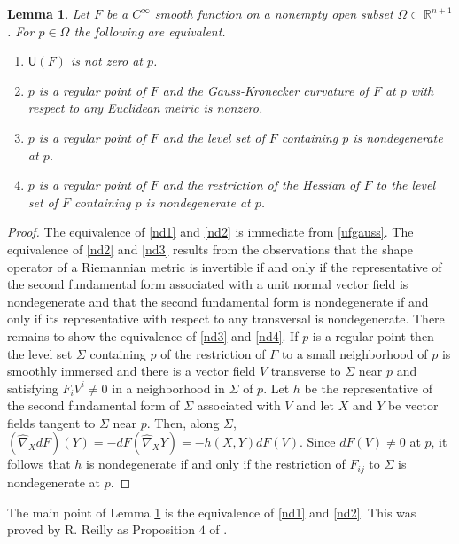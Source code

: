 \documentclass [leqno, 10pt]{amsart}
\newtheorem{lemma}[theorem]{Lemma}
\theoremstyle{definition}
\numberwithin{equation}{section}
\newcommand{\Om}{\Omega}
\newcommand{\U}{\mathsf{U}}
\newcommand{\cinf}{C^{\infty}}
\newcommand{\hnabla}{\widehat{\nabla}}
\newcommand{\rea}{\mathbb R}
\begin{document}
\begin{lemma}\label{nondegenlemma}
Let $F$ be a $\cinf$ smooth function on a nonempty open subset $\Om \subset \rea^{n+1}$. 
For $p \in \Omega$ the following are equivalent.
\begin{enumerate}
\item\label{nd1} $\U(F)$ is not zero at $p$.
\item\label{nd2} $p$ is a regular point of $F$ and the Gauss-Kronecker curvature of $F$ at $p$ with respect to any Euclidean metric is nonzero.
\item\label{nd3} $p$ is a regular point of $F$ and the level set of $F$ containing $p$ is nondegenerate at $p$.
\item\label{nd4} $p$ is a regular point of $F$ and the restriction of the Hessian of $F$ to the level set of $F$ containing $p$ is nondegenerate at $p$. 
\end{enumerate}
\end{lemma}
\begin{proof}
The equivalence of \eqref{nd1} and \eqref{nd2} is immediate from \eqref{ufgauss}. The equivalence of \eqref{nd2} and \eqref{nd3} results from the observations that the shape operator of a Riemannian metric is invertible if and only if the representative of the second fundamental form associated with a unit normal vector field is nondegenerate and that the second fundamental form is nondegenerate if and only if its representative with respect to any transversal is nondegenerate. There remains to show the equivalence of \eqref{nd3} and \eqref{nd4}. If $p$ is a regular point then the level set $\Sigma$ containing $p$ of the restriction of $F$ to a small neighborhood of $p$ is smoothly immersed and there is a vector field $V$ transverse to $\Sigma$ near $p$ and satisfying $F_{i}V^{i} \neq 0$ in a neighborhood in $\Sigma$ of $p$. Let $h$ be the representative of the second fundamental form of $\Sigma$ associated with $V$ and let $X$ and $Y$ be vector fields tangent to $\Sigma$ near $p$. Then, along $\Sigma$, $(\hnabla_{X}dF)(Y) = -dF(\hnabla_{X}Y) = -h(X,Y)dF(V)$. Since $dF(V) \neq 0$ at $p$, it follows that $h$ is nondegenerate if and only if the restriction of $F_{ij}$ to $\Sigma$ is nondegenerate at $p$.
\end{proof}
\begin{remark}
The main point of Lemma \ref{nondegenlemma} is the equivalence of \eqref{nd1} and \eqref{nd2}. This was proved by R. Reilly as Proposition $4$ of \cite{Reilly-affine}.
\end{remark}
\end{document}
